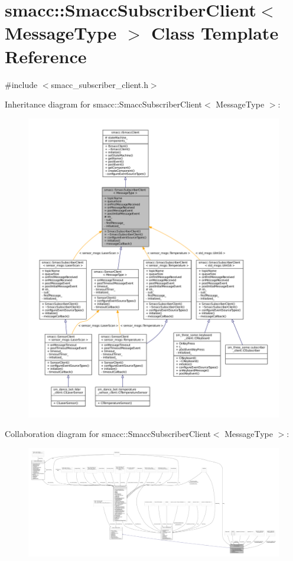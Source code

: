 \hypertarget{classsmacc_1_1SmaccSubscriberClient}{}\section{smacc\+:\+:Smacc\+Subscriber\+Client$<$ Message\+Type $>$ Class Template Reference}
\label{classsmacc_1_1SmaccSubscriberClient}


{\ttfamily \#include $<$smacc\+\_\+subscriber\+\_\+client.\+h$>$}



Inheritance diagram for smacc\+:\+:Smacc\+Subscriber\+Client$<$ Message\+Type $>$\+:
\nopagebreak
\begin{figure}[H]
\begin{center}
\leavevmode
\includegraphics[width=350pt]{classsmacc_1_1SmaccSubscriberClient__inherit__graph}
\end{center}
\end{figure}


Collaboration diagram for smacc\+:\+:Smacc\+Subscriber\+Client$<$ Message\+Type $>$\+:
\nopagebreak
\begin{figure}[H]
\begin{center}
\leavevmode
\includegraphics[width=350pt]{classsmacc_1_1SmaccSubscriberClient__coll__graph}
\end{center}
\end{figure}
